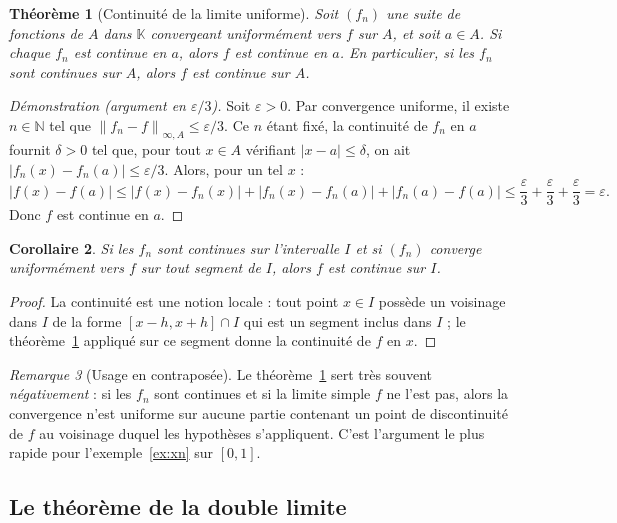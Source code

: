 \documentclass[11pt,a4paper]{article}
\theoremstyle{plain}
\newtheorem{theoreme}{Théorème}[section]
\newtheorem{corollaire}[theoreme]{Corollaire}
\theoremstyle{definition}
\theoremstyle{remark}
\newtheorem{remarque}[theoreme]{Remarque}
\newcommand{\N}{\mathbb{N}}
\newcommand{\K}{\mathbb{K}}
\newcommand{\eps}{\varepsilon}
\newcommand{\Ninf}[2]{\left\lVert #1 \right\rVert_{\infty,#2}}
\numberwithin{equation}{section}
\begin{document}
\begin{theoreme}[Continuité de la limite uniforme]\label{thm:continuite}
Soit $(f_n)$ une suite de fonctions de $A$ dans $\K$ convergeant
uniformément vers $f$ sur $A$, et soit $a\in A$. Si chaque $f_n$ est
continue en $a$, alors $f$ est continue en $a$. En particulier, si les
$f_n$ sont continues sur $A$, alors $f$ est continue sur $A$.
\end{theoreme}

\begin{proof}[Démonstration (argument en $\eps/3$)]
Soit $\eps>0$. Par convergence uniforme, il existe $n\in\N$ tel que
$\Ninf{f_n-f}{A}\leq\eps/3$. Ce $n$ étant fixé, la continuité de $f_n$ en
$a$ fournit $\delta>0$ tel que, pour tout $x\in A$ vérifiant
$\lvert x-a\rvert\leq\delta$, on ait
$\lvert f_n(x)-f_n(a)\rvert\leq\eps/3$. Alors, pour un tel $x$ :
\[
    \lvert f(x)-f(a)\rvert
    \leq \lvert f(x)-f_n(x)\rvert + \lvert f_n(x)-f_n(a)\rvert
       + \lvert f_n(a)-f(a)\rvert
    \leq \frac{\eps}{3}+\frac{\eps}{3}+\frac{\eps}{3} = \eps .
\]
Donc $f$ est continue en $a$.
\end{proof}

\begin{corollaire}\label{cor:continuite-segment}
Si les $f_n$ sont continues sur l'intervalle $I$ et si $(f_n)$ converge
uniformément vers $f$ \emph{sur tout segment de $I$}, alors $f$ est
continue sur $I$.
\end{corollaire}

\begin{proof}
La continuité est une notion locale : tout point $x\in I$ possède un
voisinage dans $I$ de la forme $[x-h,x+h]\cap I$ qui est un segment inclus
dans $I$ ; le théorème~\ref{thm:continuite} appliqué sur ce segment donne
la continuité de $f$ en $x$.
\end{proof}

\begin{remarque}[Usage en contraposée]
Le théorème~\ref{thm:continuite} sert très souvent \emph{négativement} :
si les $f_n$ sont continues et si la limite simple $f$ ne l'est pas, alors
la convergence n'est uniforme sur aucune partie contenant un point de
discontinuité de $f$ au voisinage duquel les hypothèses s'appliquent.
C'est l'argument le plus rapide pour l'exemple~\ref{ex:xn} sur $[0,1]$.
\end{remarque}

\subsection{Le théorème de la double limite}
\end{document}
